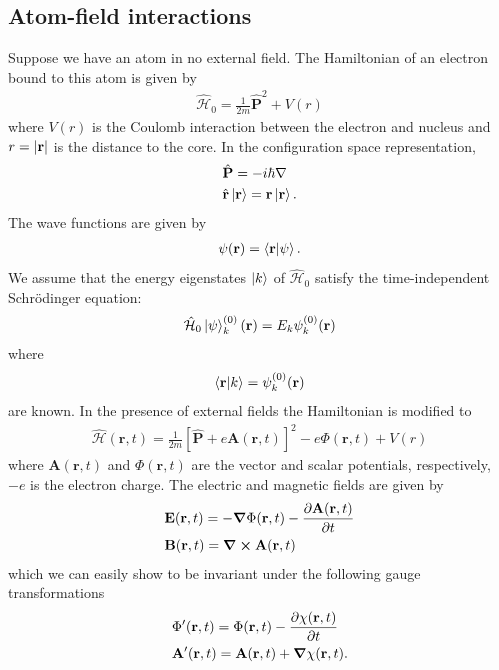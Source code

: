 \documentclass{book}
\theoremstyle{definition}
\newcommand{\p}{\partial}
\newcommand{\ham}{\mathcal{H}}
\newcommand{\f}[2]{\frac{#1}{#2}}
\newcommand{\lb}{\left[}
\newcommand{\rb}{\right]}
\begin{document}
\subsection{Atom-field interactions}
Suppose we have an atom in no external field. The Hamiltonian of an electron bound to this atom is given by
\begin{align}
\hat{\ham}_0 = \f{1}{2m}\hat{\mathbf{P}}^2 + V(r)
\end{align}
where $V(r)$ is the Coulomb interaction between the electron and nucleus and $r = \abs{\mathbf{r}}$ is the distance to the core. In the configuration space representation, 
\begin{align}
&\hat{\mathbf{P}} = -i \hbar \nabla\\
&\hat{\mathbf{r}}\ket{\mathbf{r}} = \mathbf{r}\ket{\mathbf{r}}.
\end{align}
The wave functions are given by
\begin{align}
\psi(\mathbf{r}) = \bra{\mathbf{r}}\ket{\psi}.
\end{align}
We assume that the energy eigenstates $\ket{k}$ of $\hat{\ham}_0$ satisfy the time-independent Schr\"{o}dinger equation:
\begin{align}
\hat{\ham}_0 \ket{\psi}_k^{(0)}(\mathbf{r}) = E_k \psi_k^{(0)}(\mathbf{r}) 
\end{align}
where 
\begin{align}
\bra{\mathbf{r}}\ket{k} = \psi_k^{(0)}(\mathbf{r})
\end{align}
are known. In the presence of external fields the Hamiltonian is modified to
\begin{align}
\hat{\ham}(\mathbf{r},t) = \f{1}{2m}\lb \hat{\mathbf{P}} + e\mathbf{A}(\mathbf{r} , t) \rb^2 - e\Phi(\mathbf{r},t) + V(r)
\end{align}
where $\mathbf{A}(\mathbf{r},t)$ and $\Phi(\mathbf{r},t)$ are the vector and scalar potentials, respectively, $-e$ is the electron charge. The electric and magnetic fields are given by
\begin{align}
&\mathbf{E}(\mathbf{r},t) = -\grad{\Phi(\mathbf{r},t)} - \f{\p \mathbf{A}(\mathbf{r},t)}{\p t}\\
&\mathbf{B}(\mathbf{r},t) = \curl{\mathbf{A}(\mathbf{r},t)}
\end{align}
which we can easily show to be invariant under the following gauge transformations
\begin{align}\label{gaug}
&\Phi'(\mathbf{r},t) = \Phi(\mathbf{r},t) - \f{\p \chi(\mathbf{r},t)}{\p t}\\
&\mathbf{A}'(\mathbf{r},t) = \mathbf{A}(\mathbf{r},t) + \grad{\chi(\mathbf{r},t)}.
\end{align}
\end{document}
